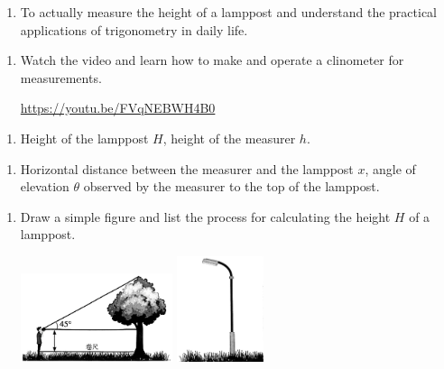 \documentclass{report}
\begin{document}
    \newpage
    \begin{explore}

    \begin{enumerate}[label=\textbf{Aim: }, leftmargin=*]
        \item To actually measure the height of a lamppost and understand the practical applications of trigonometry in daily life.
    \end{enumerate}

    \vspace{-2em}
    \begin{enumerate}[label=\textbf{Tool: }, leftmargin=*]
        \item Watch the video and learn how to make and operate a clinometer for measurements. 
    
        \url{https://youtu.be/FVqNEBWH4B0}
    \end{enumerate}   

    \vspace{-2em}
    \begin{enumerate}[label=\textbf{Control Variables: }, leftmargin=*]
        \item Height of the lamppost $H$, height of the measurer $h$.
    \end{enumerate}

    \vspace{-2em}
    \begin{enumerate}[label=\textbf{Manipulated Variables: }, leftmargin=*]
        \item Horizontal distance between the measurer and the lamppost $x$, angle of elevation $\theta$ observed by the measurer to the top of the lamppost.
    \end{enumerate}

    \vspace{-2em}
    \begin{enumerate}[label=\textbf{Procedure: }, leftmargin=*]
        \item Draw a simple figure and list the process for calculating the height $H$ of a lamppost.
        \begin{center}
            \includegraphics[width=0.35\textwidth]{assets/10-62.jpg}
            \hspace{3em}
            \includegraphics[width=0.2\textwidth]{assets/10-61.jpg}
        \end{center}
    \end{enumerate}


\end{explore}
\end{document}

